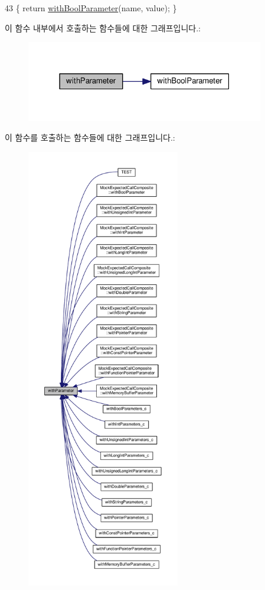 \begin{DoxyCode}
43 \{ \textcolor{keywordflow}{return} \hyperlink{class_mock_expected_call_a6863a4109e609a7276dc2abdea6b8a74}{withBoolParameter}(name, value); \}
\end{DoxyCode}


이 함수 내부에서 호출하는 함수들에 대한 그래프입니다.\+:
\nopagebreak
\begin{figure}[H]
\begin{center}
\leavevmode
\includegraphics[width=295pt]{class_mock_expected_call_a9d735dfb585c1351650fcfad40f138bc_cgraph}
\end{center}
\end{figure}




이 함수를 호출하는 함수들에 대한 그래프입니다.\+:
\nopagebreak
\begin{figure}[H]
\begin{center}
\leavevmode
\includegraphics[height=550pt]{class_mock_expected_call_a9d735dfb585c1351650fcfad40f138bc_icgraph}
\end{center}
\end{figure}


